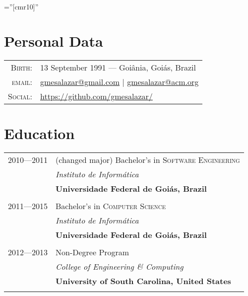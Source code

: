 \documentclass[a4paper,10pt]{article}
\begin{document}
\font\fb=''[cmr10]''

\par{\bigskip\par\vspace{8ex}}

\section{Personal Data}

\begin{tabular}{r p{3.5in}}
  \textsc{Birth:} & 13 September 1991 \hspace{0.5em}---\hspace{0.5em} Goiânia, Goiás, Brazil\\
  \textsc{email:}     & \href{mailto:gmesalazar@gmail.com}{gmesalazar@gmail.com} | \href{mailto:gmesalazar@acm.org}{gmesalazar@acm.org}\\
  \textsc{Social:} & \href{https://github.com/gmesalazar/}{https://github.com/gmesalazar/}
\end{tabular}

\section{Education}
\begin{tabular}{r|p{11cm}}

  \textsc{2010---2011} & (changed major) Bachelor's in \textsc{Software Engineering}\\ &
  \emph{Instituto de Informática}\\ &
  \textbf{Universidade Federal de Goiás, Brazil}
  \\\multicolumn{2}{c}{} \\

  \textsc{2011---2015} & Bachelor's in \textsc{Computer Science}\\ &
  \emph{Instituto de Informática}\\ &
  \textbf{Universidade Federal de Goiás, Brazil}
  \\\multicolumn{2}{c}{} \\

  \textsc{2012---2013} & Non-Degree Program\\ &
  \emph{College of Engineering \& Computing}\\ &
  \textbf{University of South Carolina, United States}
  \\\multicolumn{2}{c}{} \\

\end{tabular}
\end{document}

